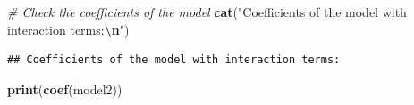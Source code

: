 \documentclass[
]{article}
\newenvironment{Shaded}{\begin{snugshade}}{\end{snugshade}}
\newcommand{\CommentTok}[1]{\textcolor[rgb]{0.56,0.35,0.01}{\textit{#1}}}
\newcommand{\FunctionTok}[1]{\textcolor[rgb]{0.13,0.29,0.53}{\textbf{#1}}}
\newcommand{\NormalTok}[1]{#1}
\newcommand{\SpecialCharTok}[1]{\textcolor[rgb]{0.81,0.36,0.00}{\textbf{#1}}}
\newcommand{\StringTok}[1]{\textcolor[rgb]{0.31,0.60,0.02}{#1}}
\begin{document}
\begin{Shaded}
\begin{Highlighting}[]
\CommentTok{\# Check the coefficients of the model}
\FunctionTok{cat}\NormalTok{(}\StringTok{"Coefficients of the model with interaction terms:}\SpecialCharTok{\textbackslash{}n}\StringTok{"}\NormalTok{)}
\end{Highlighting}
\end{Shaded}

\begin{verbatim}
## Coefficients of the model with interaction terms:
\end{verbatim}

\begin{Shaded}
\begin{Highlighting}[]
\FunctionTok{print}\NormalTok{(}\FunctionTok{coef}\NormalTok{(model2))}
\end{Highlighting}
\end{Shaded}
\end{document}
